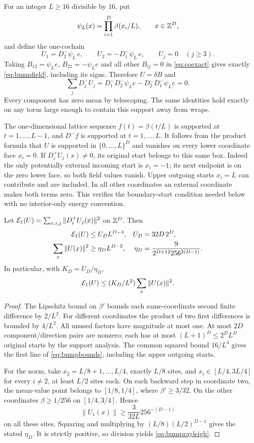 For an integer $L\ge16$ divisible by $16$, put
\[
 \psi_L(x)=\prod_{i=1}^D\beta(x_i/L),\qquad x\in\mathbb Z^D,
\]
and define the one-cochain
\begin{equation}\label{eq:bumpfield}
 U_1=D_2^-\psi_L\,e,\qquad U_2=-D_1^-\psi_L\,e,
 \qquad U_j=0\quad(j\ge3).
\end{equation}
Taking $B_{12}=\psi_Le$, $B_{21}=-\psi_Le$ and all other $B_{ij}=0$
in \eqref{eq:coexact} gives exactly \eqref{eq:bumpfield}, including its
signs. Therefore $U=\delta B$ and
\[
 \sum_jD_j^-U_j=D_1^-D_2^-\psi_Le-D_2^-D_1^-\psi_Le=0.
\]
Every component has zero mean by telescoping. The same identities hold
exactly on any torus large enough to contain this support away from wraps.

The one-dimensional lattice sequence $f(t)=\beta(t/L)$ is supported at
$t=1,\ldots,L-1$, and $D^-f$ is supported at $t=1,\ldots,L$.
It follows from the product formula that $U$ is supported in
$\{0,\ldots,L\}^D$ and vanishes on every lower coordinate face $x_i=0$.
If $D_i^+U_j(x)\ne0$, its original start belongs to this same box.
Indeed the only potentially external incoming start is $x_i=-1$; its next
endpoint is on the zero lower face, so both field values vanish. Upper
outgoing starts $x_i=L$ can contribute and are included. In all other
coordinates an external coordinate makes both terms zero. This verifies the
boundary-start condition needed below with no interior-only energy convention.

\begin{lemma}\label{lem:bump}
Let $\mathcal E_1(U)=\sum_{x,i,j}\|D_i^+U_j(x)\|^2$ on $\mathbb Z^D$. Then
\begin{align}\label{eq:bumpbounds}
 \mathcal E_1(U)&\le U_D L^{D-4},& U_D&=32D\,2^D,\nonumber\\
 \sum_x\|U(x)\|^2&\ge\eta_D L^{D-2},&
 \eta_D&=\frac9{2^{D+12}256^{2(D-1)}}.
\end{align}
In particular, with $K_D=U_D/\eta_D$,
\begin{equation}\label{eq:bumprayleigh}
 \mathcal E_1(U)\le (K_D/L^2)\sum_x\|U(x)\|^2.
\end{equation}
\end{lemma}
\begin{proof}
The Lipschitz bound on $\beta'$ bounds each same-coordinate second finite
difference by $2/L^2$. For different coordinates the product of two first
differences is bounded by $4/L^2$. All unused factors have magnitude at most
one. At most $2D$ component/direction pairs are nonzero; each has at most
$(L+1)^D\le2^DL^D$ original starts by the support analysis. The common
squared bound $16/L^4$ gives the first line of \eqref{eq:bumpbounds},
including the upper outgoing starts.

For the norm, take $x_2=L/8+1,\ldots,L/4$, exactly $L/8$ sites,
and $x_i\in[L/4,3L/4]$ for every $i\ne2$, at least $L/2$ sites each.
On each backward step in coordinate two, the mean-value point belongs to
$[1/8,1/4]$, where $\beta'\ge3/32$. On the other coordinates
$\beta\ge1/256$ on $[1/4,3/4]$. Hence
\[
 \|U_1(x)\|\ge\frac3{32L}256^{-(D-1)}
\]
on all these sites. Squaring and multiplying by
$(L/8)(L/2)^{D-1}$ gives the stated $\eta_D$. It is strictly positive,
so division yields \eqref{eq:bumprayleigh}.
\end{proof}

